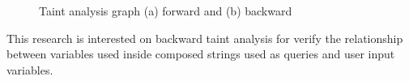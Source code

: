 \begin{figure}[ht]
\centering
{}
\caption{Taint analysis graph (a) forward and (b) backward}
\label{fig:taint01}
\end{figure}

This research is interested on backward taint analysis for verify the relationship between variables used inside composed strings used as queries and user input variables. 
